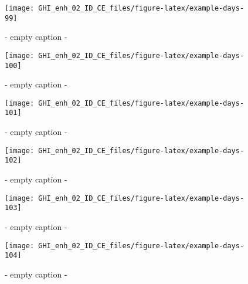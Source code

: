 \documentclass[
  10pt,
  a4paper,oneside]{article}
\begin{document}
\begin{figure}[H]

{\centering \texttt{[image: GHI\_enh\_02\_ID\_CE\_files/figure-latex/example-days-99]} 

}

\caption{ - empty caption - }\label{fig:example-days-99}
\end{figure}

\begin{figure}[H]

{\centering \texttt{[image: GHI\_enh\_02\_ID\_CE\_files/figure-latex/example-days-100]} 

}

\caption{ - empty caption - }\label{fig:example-days-100}
\end{figure}

\begin{figure}[H]

{\centering \texttt{[image: GHI\_enh\_02\_ID\_CE\_files/figure-latex/example-days-101]} 

}

\caption{ - empty caption - }\label{fig:example-days-101}
\end{figure}

\begin{figure}[H]

{\centering \texttt{[image: GHI\_enh\_02\_ID\_CE\_files/figure-latex/example-days-102]} 

}

\caption{ - empty caption - }\label{fig:example-days-102}
\end{figure}

\begin{figure}[H]

{\centering \texttt{[image: GHI\_enh\_02\_ID\_CE\_files/figure-latex/example-days-103]} 

}

\caption{ - empty caption - }\label{fig:example-days-103}
\end{figure}

\begin{figure}[H]

{\centering \texttt{[image: GHI\_enh\_02\_ID\_CE\_files/figure-latex/example-days-104]} 

}

\caption{ - empty caption - }\label{fig:example-days-104}
\end{figure}
\end{document}
